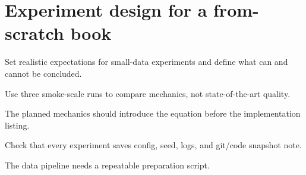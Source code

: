 \section{Experiment design for a from-scratch book}
\label{sec:ch11-experiment-design-for-a-from-scratch-book}

Set realistic expectations for small-data experiments and define what can and cannot be concluded.



Use three smoke-scale runs to compare mechanics, not state-of-the-art quality.



The planned mechanics should introduce the equation before the implementation listing.





\begin{checkpointbox}
Check that every experiment saves config, seed, logs, and git/code snapshot note.
\end{checkpointbox}

The data pipeline needs a repeatable preparation script.

